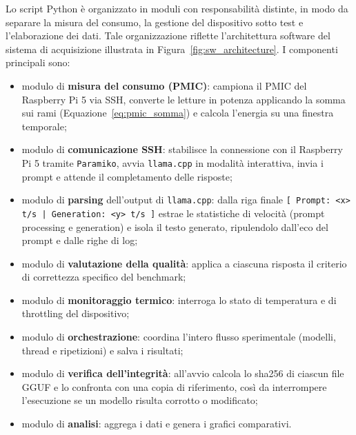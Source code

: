 Lo script Python è organizzato in moduli con responsabilità distinte, in modo da
separare la misura del consumo, la gestione del dispositivo sotto
test e l'elaborazione dei dati. Tale organizzazione riflette l'architettura
software del sistema di acquisizione illustrata in
Figura~\ref{fig:sw_architecture}. I componenti principali sono:
\begin{itemize}
    \item modulo di \textbf{misura del consumo (PMIC)}: campiona il PMIC del
    Raspberry Pi 5 via SSH, converte le letture in potenza applicando la somma sui
    rami (Equazione~\ref{eq:pmic_somma}) e calcola l'energia su una finestra temporale;

    \item modulo di \textbf{comunicazione SSH}: stabilisce la connessione con il
    Raspberry Pi 5 tramite \texttt{Paramiko}, avvia \texttt{llama.cpp} in modalità
    interattiva, invia i prompt e attende il completamento delle risposte;

    \item modulo di \textbf{parsing} dell'output di \texttt{llama.cpp}: dalla riga
    finale \texttt{[ Prompt: <x> t/s | Generation: <y> t/s ]} estrae le statistiche
    di velocità (prompt processing e generation) e isola il testo generato,
    ripulendolo dall'eco del prompt e dalle righe di log;

    \item modulo di \textbf{valutazione della qualità}: applica a ciascuna risposta
    il criterio di correttezza specifico del benchmark;

    \item modulo di \textbf{monitoraggio termico}: interroga lo stato di
    temperatura e di throttling del dispositivo;

    \item modulo di \textbf{orchestrazione}: coordina l'intero flusso sperimentale
    (modelli, thread e ripetizioni) e salva i risultati;

    \item modulo di \textbf{verifica dell'integrità}: all'avvio calcola lo sha256
    di ciascun file GGUF e lo confronta con una copia di riferimento, così da
    interrompere l'esecuzione se un modello risulta corrotto o modificato;

    \item modulo di \textbf{analisi}: aggrega i dati e genera i grafici comparativi.
\end{itemize}


